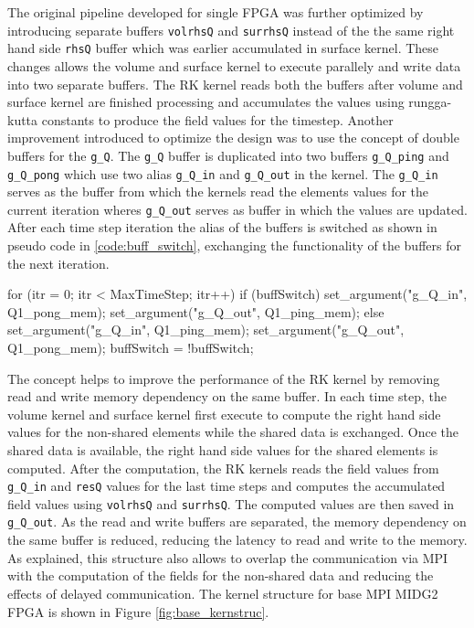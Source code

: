 
The original pipeline developed for single FPGA was further optimized by introducing separate buffers
\texttt{volrhsQ} and \texttt{surrhsQ} instead of the the same right hand side \texttt{rhsQ} buffer
which was earlier accumulated in surface kernel. These changes allows the volume and surface kernel
to execute parallely and write data into two separate buffers. The RK kernel reads both the buffers
after volume and surface kernel are finished processing and accumulates the values using rungga-kutta
constants to produce the field values for the timestep. Another improvement introduced to optimize the
design was to use the concept of double buffers for the \texttt{g\_Q}. The \texttt{g\_Q} buffer is
duplicated into two buffers \texttt{g\_Q\_ping} and \texttt{g\_Q\_pong} which use two alias \texttt{g\_Q\_in}
and \texttt{g\_Q\_out} in the kernel. The \texttt{g\_Q\_in} serves as the buffer from which the kernels read
the elements values for the current iteration wheres \texttt{g\_Q\_out} serves as buffer in which the values
are updated. After each time step iteration the alias of the buffers is switched as shown
in pseudo code in \ref{code:buff_switch}, exchanging the functionality of the buffers for the next iteration.

\begin{CppCode}[caption=Buffer switching for double buffers in each iteration, frame=tlrb, label=code:buff_switch]
for (itr = 0; itr < MaxTimeStep; itr++)
{
    if (buffSwitch)
    {
        set_argument("g_Q_in", Q1_pong_mem);
        set_argument("g_Q_out", Q1_ping_mem);
    }
    else
    {
        set_argument("g_Q_in", Q1_ping_mem);
        set_argument("g_Q_out", Q1_pong_mem);
    }
    buffSwitch = !buffSwitch;
}
\end{CppCode}

The concept helps to improve the performance of the RK kernel
by removing read and write memory dependency on the same buffer. In each time step,
the volume kernel and surface kernel first execute to compute the right hand side values for the
non-shared elements while the shared data is exchanged. Once the shared data is available,
the right hand side values for the shared elements is computed. After the computation,
the RK kernels reads the field values from \texttt{g\_Q\_in} and \texttt{resQ} values
for the last time steps and computes the accumulated field values using
\texttt{volrhsQ} and \texttt{surrhsQ}. The computed values are then saved in \texttt{g\_Q\_out}.
As the read and write buffers are separated, the memory dependency on the same buffer is reduced,
reducing the latency to read and write to the memory. As explained, this structure also allows
to overlap the communication via MPI with the computation of the fields for the non-shared data
and reducing the effects of delayed communication. The kernel structure for base MPI MIDG2 FPGA
is shown in Figure \ref{fig:base_kernstruc}.

